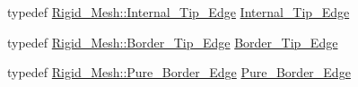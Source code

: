 \begin{DoxyCompactItemize}
\item 
typedef \hyperlink{classFVCode3D_1_1Rigid__Mesh_1_1Internal__Tip__Edge}{Rigid\+\_\+\+Mesh\+::\+Internal\+\_\+\+Tip\+\_\+\+Edge} \hyperlink{classFVCode3D_1_1Exporter_a7d2120b3d975d2a1cc43f663adc2583e}{Internal\+\_\+\+Tip\+\_\+\+Edge}
\item 
typedef \hyperlink{classFVCode3D_1_1Rigid__Mesh_1_1Border__Tip__Edge}{Rigid\+\_\+\+Mesh\+::\+Border\+\_\+\+Tip\+\_\+\+Edge} \hyperlink{classFVCode3D_1_1Exporter_a95d20e766a6bafa58cf9b4965d5dae09}{Border\+\_\+\+Tip\+\_\+\+Edge}
\item 
typedef \hyperlink{classFVCode3D_1_1Rigid__Mesh_1_1Pure__Border__Edge}{Rigid\+\_\+\+Mesh\+::\+Pure\+\_\+\+Border\+\_\+\+Edge} \hyperlink{classFVCode3D_1_1Exporter_a8ba1ca5b3f60e4934f9854273df002ce}{Pure\+\_\+\+Border\+\_\+\+Edge}
\end{DoxyCompactItemize}

